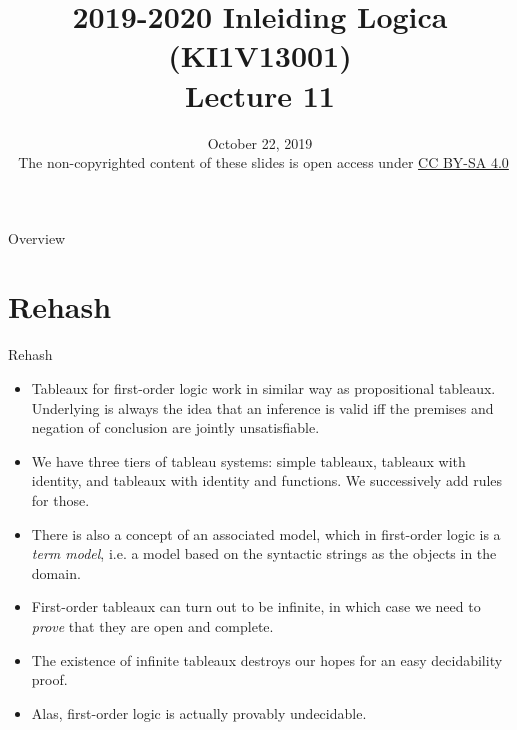 \documentclass[../slides.tex]{subfiles}
\title{2019-2020 Inleiding Logica (KI1V13001) \\ Lecture 11}
\date{October 22, 2019\\[2ex] {\tiny \textcopyright~The non-copyrighted content of these slides is open access under \href{https://creativecommons.org/licenses/by-sa/4.0/}{CC BY-SA 4.0}}}
\begin{document}
\setcounter{framenumber}{346}
\begin{frame}
	\maketitle
\end{frame}

\begin{frame}{Overview}
\tableofcontents
\end{frame}

\section{Rehash}
\begin{frame}{Rehash}
	
\begin{itemize}
	
		\item Tableaux for first-order logic work in similar
                  way as propositional tableaux. Underlying is always
                  the idea that an inference is valid iff the premises
                  and negation of conclusion are jointly
                  unsatisfiable.
                  
		\item We have three tiers of tableau systems: simple
                  tableaux, tableaux with identity, and tableaux with
                  identity and functions. We successively add
                  rules for those.
		
		\item There is also a concept of an associated model,
                  which in first-order logic is a \emph{term model},
                  i.e. a model based on the syntactic strings as the
                  objects in the domain.
		
		\item First-order tableaux can turn out to be
                  infinite, in which case we need to \emph{prove} that
                  they are open and complete.
		
		\item The existence of infinite tableaux destroys our
                  hopes for an easy decidability proof.
		
		\item Alas, first-order logic is actually provably
                  undecidable.
		
					
\end{itemize}

\end{frame}
		
\end{document}
